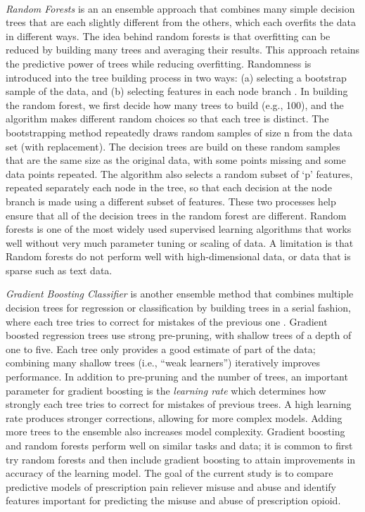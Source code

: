 \\\documentclass[sigconf]{acmart}
\begin{document}
\emph{Random Forests} is an an ensemble approach that combines many simple
decision trees that are each slightly different from the others, which each 
overfits the data in different ways. The idea behind random forests is that 
overfitting can be reduced by building many trees and averaging their results. 
This approach retains the predictive power of trees while reducing overfitting. 
Randomness is introduced into the tree building process in two ways: (a) 
selecting a bootstrap sample of the data, and (b) selecting features in each 
node branch \cite{muller17,raschka17}. In building the random forest, we first 
decide how many trees to build (e.g., 100), and the algorithm makes different 
random choices so that each tree is distinct. The bootstrapping method 
repeatedly draws random samples of size n from the data set (with replacement). 
The decision trees are build on these random samples that are the same size as 
the original data, with some points missing and some data points repeated. The 
algorithm also selects a random subset of `p' features, repeated separately 
each node in the tree, so that each decision at the node branch is made using a 
different subset of features. These two processes help ensure that all of the 
decision trees in the random forest are different. Random forests is one of the 
most widely used supervised learning algorithms that works well without very 
much parameter tuning or scaling of data. A limitation is that Random forests 
do not perform well with high-dimensional data, or data that is sparse 
such as text data.


\emph{Gradient Boosting Classifier} is another ensemble method that combines 
multiple decision trees for regression or classification by building trees 
in a serial fashion, where each tree tries to correct for mistakes of the 
previous one \cite{muller17}. Gradient boosted regression trees use strong 
pre-pruning, with shallow trees of a depth of one to five. Each tree only 
provides a good estimate of part of the data; combining many shallow trees 
(i.e., ``weak learners'') iteratively improves performance. In addition to 
pre-pruning and the number of trees, an important parameter for gradient 
boosting is the \emph{learning rate} which determines how strongly each
tree tries to correct for mistakes of previous trees. A high learning rate
produces stronger corrections, allowing for more complex models. Adding
more trees to the ensemble also increases model complexity. Gradient boosting
and random forests perform well on similar tasks and data; it is common to
first try random forests and then include gradient boosting to attain 
improvements in accuracy of the learning model. The goal of the current study 
is to compare predictive models of prescription pain reliever misuse and 
abuse and identify features important for predicting the misuse and abuse of
prescription opioid. 
\end{document}
